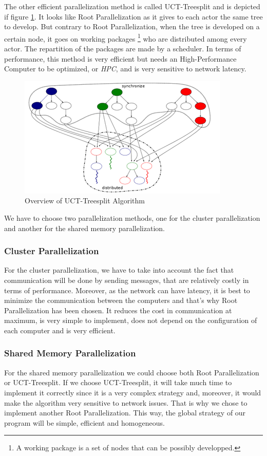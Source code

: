 The other efficient parallelization method is called UCT-Treesplit and is depicted if figure \ref{fig:treesplit}. It looks like Root Parallelization as it gives to each actor the same tree to develop.
But contrary to Root Parallelization, when the tree is developed on a certain node, it goes on working packages \footnote{A working package is a set of nodes that can be possibly developped.} who are distributed among every actor. The repartition of the packages are made by a scheduler.
In terms of performance, this method is very efficient but needs an High-Performance Computer to be optimized, or \emph{HPC}, and is very sensitive to network latency.

\begin{figure}[!ht] 
\centerline{\includegraphics[scale=0.80]{3Methods/3.1Parallelization_Method/treesplit.png}}
   \caption{Overview of UCT-Treesplit Algorithm}
\label{fig:treesplit}
\end{figure}


We have to choose two parallelization methods, one for the cluster parallelization and another for the shared memory parallelization.
\subsubsection{Cluster Parallelization}
For the cluster parallelization, we have to take into account the fact that communication will be done by sending messages, that are relatively costly in terms of performance.
Moreover, as the network can have latency, it is best to minimize the communication between the computers and that's why Root Parallelization has been chosen.
It reduces the cost in communication at maximum, is very simple to implement, does not depend on the configuration of each computer and is very efficient\cite{parallel_comp}.
\subsubsection{Shared Memory Parallelization}
For the shared memory parallelization we could choose both Root Parallelization or UCT-Treesplit.
If we choose UCT-Treesplit, it will take much time to implement it correctly since it is a very complex strategy and, moreover, it would make the algorithm very sensitive to network issues. That is why we chose to implement another Root Parallelization. This way, the global strategy of our program will be simple, efficient and homogeneous.
